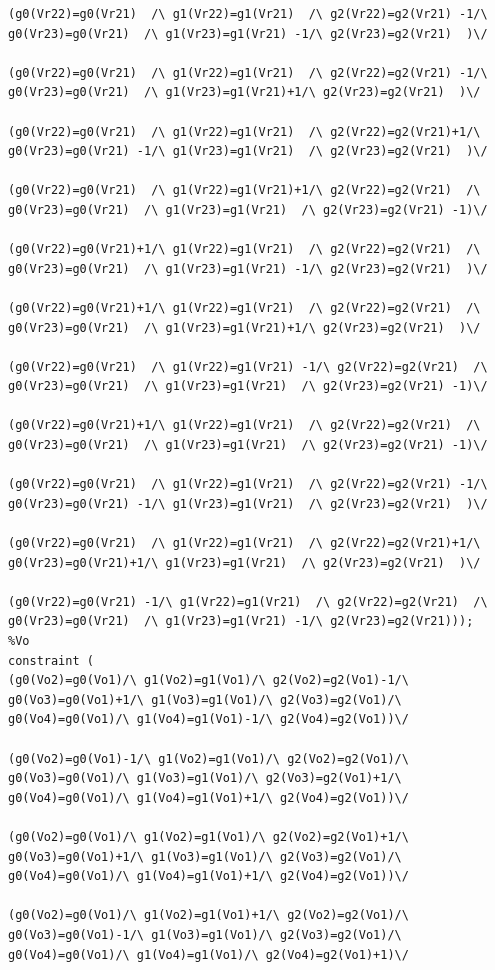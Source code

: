 \begin{appendices}
\begin{lstlisting}
(g0(Vr22)=g0(Vr21)  /\ g1(Vr22)=g1(Vr21)  /\ g2(Vr22)=g2(Vr21) -1/\ g0(Vr23)=g0(Vr21)  /\ g1(Vr23)=g1(Vr21) -1/\ g2(Vr23)=g2(Vr21)  )\/ 

(g0(Vr22)=g0(Vr21)  /\ g1(Vr22)=g1(Vr21)  /\ g2(Vr22)=g2(Vr21) -1/\ g0(Vr23)=g0(Vr21)  /\ g1(Vr23)=g1(Vr21)+1/\ g2(Vr23)=g2(Vr21)  )\/ 

(g0(Vr22)=g0(Vr21)  /\ g1(Vr22)=g1(Vr21)  /\ g2(Vr22)=g2(Vr21)+1/\ g0(Vr23)=g0(Vr21) -1/\ g1(Vr23)=g1(Vr21)  /\ g2(Vr23)=g2(Vr21)  )\/ 

(g0(Vr22)=g0(Vr21)  /\ g1(Vr22)=g1(Vr21)+1/\ g2(Vr22)=g2(Vr21)  /\ g0(Vr23)=g0(Vr21)  /\ g1(Vr23)=g1(Vr21)  /\ g2(Vr23)=g2(Vr21) -1)\/ 

(g0(Vr22)=g0(Vr21)+1/\ g1(Vr22)=g1(Vr21)  /\ g2(Vr22)=g2(Vr21)  /\ g0(Vr23)=g0(Vr21)  /\ g1(Vr23)=g1(Vr21) -1/\ g2(Vr23)=g2(Vr21)  )\/ 

(g0(Vr22)=g0(Vr21)+1/\ g1(Vr22)=g1(Vr21)  /\ g2(Vr22)=g2(Vr21)  /\ g0(Vr23)=g0(Vr21)  /\ g1(Vr23)=g1(Vr21)+1/\ g2(Vr23)=g2(Vr21)  )\/ 

(g0(Vr22)=g0(Vr21)  /\ g1(Vr22)=g1(Vr21) -1/\ g2(Vr22)=g2(Vr21)  /\ g0(Vr23)=g0(Vr21)  /\ g1(Vr23)=g1(Vr21)  /\ g2(Vr23)=g2(Vr21) -1)\/ 

(g0(Vr22)=g0(Vr21)+1/\ g1(Vr22)=g1(Vr21)  /\ g2(Vr22)=g2(Vr21)  /\ g0(Vr23)=g0(Vr21)  /\ g1(Vr23)=g1(Vr21)  /\ g2(Vr23)=g2(Vr21) -1)\/ 

(g0(Vr22)=g0(Vr21)  /\ g1(Vr22)=g1(Vr21)  /\ g2(Vr22)=g2(Vr21) -1/\ g0(Vr23)=g0(Vr21) -1/\ g1(Vr23)=g1(Vr21)  /\ g2(Vr23)=g2(Vr21)  )\/ 

(g0(Vr22)=g0(Vr21)  /\ g1(Vr22)=g1(Vr21)  /\ g2(Vr22)=g2(Vr21)+1/\ g0(Vr23)=g0(Vr21)+1/\ g1(Vr23)=g1(Vr21)  /\ g2(Vr23)=g2(Vr21)  )\/ 

(g0(Vr22)=g0(Vr21) -1/\ g1(Vr22)=g1(Vr21)  /\ g2(Vr22)=g2(Vr21)  /\ g0(Vr23)=g0(Vr21)  /\ g1(Vr23)=g1(Vr21) -1/\ g2(Vr23)=g2(Vr21)));
%Vo
constraint (
(g0(Vo2)=g0(Vo1)/\ g1(Vo2)=g1(Vo1)/\ g2(Vo2)=g2(Vo1)-1/\ g0(Vo3)=g0(Vo1)+1/\ g1(Vo3)=g1(Vo1)/\ g2(Vo3)=g2(Vo1)/\ g0(Vo4)=g0(Vo1)/\ g1(Vo4)=g1(Vo1)-1/\ g2(Vo4)=g2(Vo1))\/ 

(g0(Vo2)=g0(Vo1)-1/\ g1(Vo2)=g1(Vo1)/\ g2(Vo2)=g2(Vo1)/\ g0(Vo3)=g0(Vo1)/\ g1(Vo3)=g1(Vo1)/\ g2(Vo3)=g2(Vo1)+1/\ g0(Vo4)=g0(Vo1)/\ g1(Vo4)=g1(Vo1)+1/\ g2(Vo4)=g2(Vo1))\/ 

(g0(Vo2)=g0(Vo1)/\ g1(Vo2)=g1(Vo1)/\ g2(Vo2)=g2(Vo1)+1/\ g0(Vo3)=g0(Vo1)+1/\ g1(Vo3)=g1(Vo1)/\ g2(Vo3)=g2(Vo1)/\ g0(Vo4)=g0(Vo1)/\ g1(Vo4)=g1(Vo1)+1/\ g2(Vo4)=g2(Vo1))\/ 

(g0(Vo2)=g0(Vo1)/\ g1(Vo2)=g1(Vo1)+1/\ g2(Vo2)=g2(Vo1)/\ g0(Vo3)=g0(Vo1)-1/\ g1(Vo3)=g1(Vo1)/\ g2(Vo3)=g2(Vo1)/\ g0(Vo4)=g0(Vo1)/\ g1(Vo4)=g1(Vo1)/\ g2(Vo4)=g2(Vo1)+1)\/ 


\end{lstlisting}
\end{appendices}
